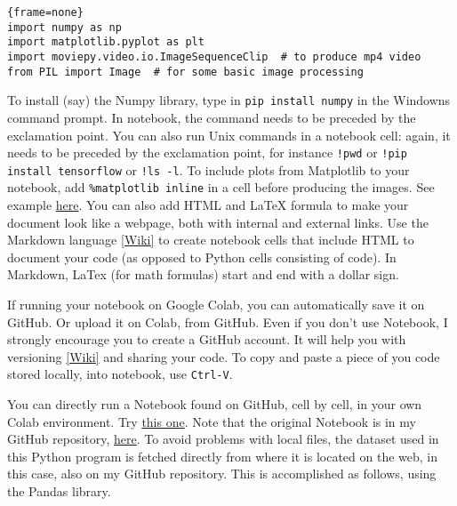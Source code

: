 \documentclass[oneside,10pt]{book}
\begin{document}
\begin{lstlisting}{frame=none}
import numpy as np
import matplotlib.pyplot as plt
import moviepy.video.io.ImageSequenceClip  # to produce mp4 video
from PIL import Image  # for some basic image processing 
\end{lstlisting}\vspace{1ex}

\noindent To install (say) the Numpy library, type in \texttt{pip install numpy} in the Windowns command prompt. In notebook, the command needs to be preceded by the exclamation point. You can also run Unix commands in a notebook cell: again, it needs to be preceded by the exclamation point, for instance \texttt{!pwd} or \texttt{!pip install tensorflow} or \texttt{!ls -l}. To include plots from Matplotlib to your notebook, add
 \texttt{\%matplotlib inline} in a cell before producing the images. See example \href{https://github.com/VincentGranville/Notebooks/blob/main/copula_insurance_nogroup.ipynb}{here}.  You can also add HTML and LaTeX formula to make your document look like a webpage, both with internal and external links. Use the \textcolor{index}{Markdown language}
 \href{https://www.markdownguide.org/getting-started/}{[Wiki]} to create notebook cells that include HTML to document your code (as opposed to Python cells consisting of code). In Markdown, \textcolor{index}{LaTex} (for math formulas) start and end with a dollar sign. 

If running your notebook on 
\textcolor{index}{Google Colab}, you can automatically save it on GitHub. Or upload it on Colab, from GitHub. Even if you don't use Notebook, I strongly encourage you to create a \textcolor{index}{GitHub} account. It will help you with 
\textcolor{index}{versioning}  \href{https://en.wikipedia.org/wiki/Software_versioning}{[Wiki]} and sharing your code. 
 To copy and paste a piece of you code stored locally, into notebook, use \texttt{Ctrl-V}. 

You can directly run a Notebook found on GitHub, cell by cell, in your own Colab environment. Try \href{https://colab.research.google.com/github/VincentGranville/Notebooks/blob/main/copula_insurance_nogroup.ipynb}{this one}. Note that the original Notebook is in 
 my GitHub repository, \href{https://github.com/VincentGranville/Notebooks/blob/main/copula_insurance_nogroup.ipynb}{here}. 
To avoid problems with local files, the dataset used in this Python program is fetched directly from where it is located on the web, in this case, also on
 my GitHub repository. This is accomplished as follows, using the 
\textcolor{index}{Pandas} library. \vspace{1ex}
\end{document}
